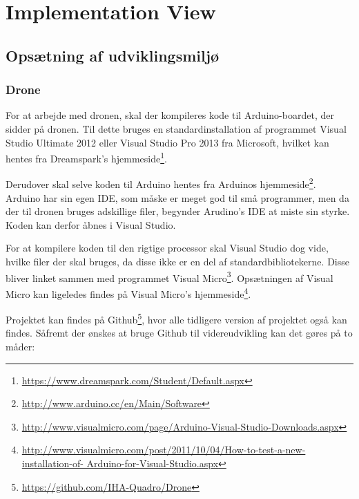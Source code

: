 \documentclass[Main]{subfiles}
\begin{document}
\section{Implementation View}


\subsection{Opsætning af udviklingsmiljø}

\subsubsection{Drone}\label{sec: Drone}
For at arbejde med dronen, skal der kompileres kode til Arduino-boardet, der sidder på dronen.
Til dette bruges en standardinstallation af programmet Visual Studio Ultimate 2012 eller Visual Studio Pro 2013 fra Microsoft, hvilket kan hentes fra Dreamspark's hjemmeside\footnote{\url{https://www.dreamspark.com/Student/Default.aspx}}.

Derudover skal selve koden til Arduino hentes fra Arduinos hjemmeside\footnote{\url{http://www.arduino.cc/en/Main/Software}}.
Arduino har sin egen IDE, som måske er meget god til små programmer, men da der til dronen bruges adskillige filer, begynder Arudino's IDE at miste sin styrke.
Koden kan derfor åbnes i Visual Studio.

For at kompilere koden til den rigtige processor skal Visual Studio dog vide, hvilke filer der skal bruges, da disse ikke er en del af standardbibliotekerne.
Disse bliver linket sammen med programmet Visual Micro\footnote{\url{http://www.visualmicro.com/page/Arduino-Visual-Studio-Downloads.aspx}}.
Opsætningen af Visual Micro kan ligeledes findes på Visual Micro's hjemmeside\footnote{\url{http://www.visualmicro.com/post/2011/10/04/How-to-test-a-new-installation-of- Arduino-for-Visual-Studio.aspx}}.

Projektet kan findes på Github\footnote{\url{https://github.com/IHA-Quadro/Drone}}, hvor alle tidligere version af projektet også kan findes.
Såfremt der ønskes at bruge Github til videreudvikling kan det gøres på to måder:
\end{document}
